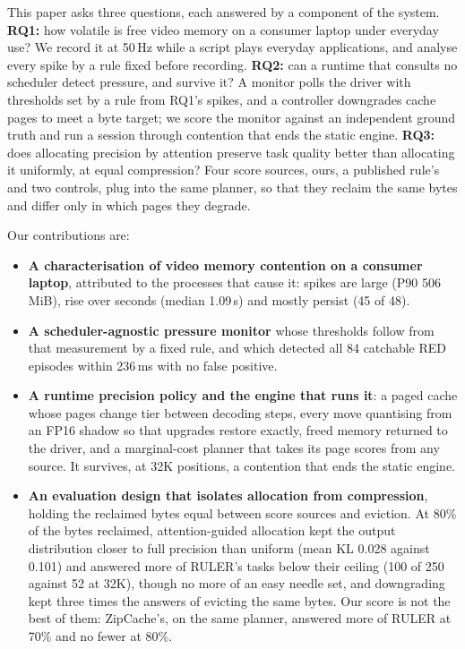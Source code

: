 \documentclass{article}
\begin{document}
This paper asks three questions, each answered by a component of the system.
\textbf{RQ1:} how volatile is free video memory on a consumer laptop under
everyday use? We record it at 50\,Hz while a script plays everyday
applications, and analyse every spike by a rule fixed before recording.
\textbf{RQ2:} can a runtime that consults no scheduler detect pressure, and
survive it? A monitor polls the driver with thresholds set by a rule from RQ1's
spikes, and a controller downgrades cache pages to meet a byte target; we score
the monitor against an independent ground truth and run a session through
contention that ends the static engine. \textbf{RQ3:} does allocating
precision by attention preserve task quality better than allocating it
uniformly, at equal compression? Four score sources, ours, a published rule's
and two controls, plug into the same planner, so that they reclaim the same bytes
and differ only in which pages they degrade.

Our contributions are:
\begin{itemize}
\item \textbf{A characterisation of video memory contention on a consumer
laptop}, attributed to the processes that cause it: spikes are large (P90
506\,MiB), rise over seconds (median 1.09\,s) and mostly persist (45 of 48).
\item \textbf{A scheduler-agnostic pressure monitor} whose thresholds follow
from that measurement by a fixed rule, and which detected all 84 catchable RED
episodes within 236\,ms with no false positive.
\item \textbf{A runtime precision policy and the engine that runs it}: a paged
cache whose pages change tier between decoding steps, every move quantising
from an FP16 shadow so that upgrades restore exactly, freed memory returned to
the driver, and a marginal-cost planner that takes its page scores from any
source. It survives, at 32K positions, a contention that ends the static
engine.
\item \textbf{An evaluation design that isolates allocation from compression},
holding the reclaimed bytes equal between score sources and eviction. At 80\%
of the bytes reclaimed, attention-guided allocation kept the output distribution
closer to full precision than uniform (mean KL 0.028 against 0.101) and answered
more of RULER's tasks below their ceiling (100 of 250 against 52 at 32K), though
no more of an easy needle set, and downgrading kept three times the answers of
evicting the same bytes. Our score is not the best of them: ZipCache's, on the
same planner, answered more of RULER at 70\% and no fewer at 80\%.
\end{itemize}
\end{document}
